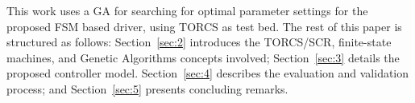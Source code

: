 This work uses a GA for searching for optimal parameter settings for the proposed FSM based driver, using TORCS as test bed. The rest of this paper is structured as follows: Section~\ref{sec:2} introduces the TORCS/SCR, finite-state machines, and Genetic Algorithms concepts involved; Section~\ref{sec:3} details the proposed controller model. Section~\ref{sec:4} describes the evaluation and validation process; and Section~\ref{sec:5} presents concluding remarks.